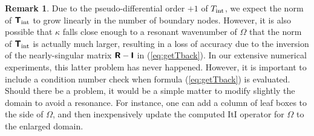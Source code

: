 \documentclass[11pt,final]{amsart}
\theoremstyle{definition}
\newtheorem{remark}{Remark}
\numberwithin{remark}{section}
\numberwithin{definition}{section}
\numberwithin{pro}{section}
\begin{document}
\begin{remark}
Due to the pseudo-differential order $+1$ of $T_{\rm int}$, we expect the norm of
$\bm{\mathsf{T}}_{\rm int}$ to grow linearly in the number of boundary nodes.
However, it is also possible that $\kappa$ falls close enough to a resonant wavenumber of $\Omega$
that the norm of $\bm{\mathsf{T}}_{\rm int}$ is actually much larger,
resulting in a loss of accuracy due to the inversion of the nearly-singular
matrix $\bm{\mathsf{R}} -\bm{\mathsf{I}}$ in (\ref{eq:getTback}).
In our extensive numerical experiments,
this latter problem has never happened.
However, it is important to include a condition number check
when formula (\ref{eq:getTback}) is evaluated. Should there be a problem, it would be
a simple matter to modify slightly the domain to avoid a resonance. For instance, one
can add a column of leaf boxes to the side of $\Omega$, and then inexpensively update the
computed ItI operator for $\Omega$ to the enlarged domain.
\label{re:omegaRes}
\end{remark}
\end{document}
